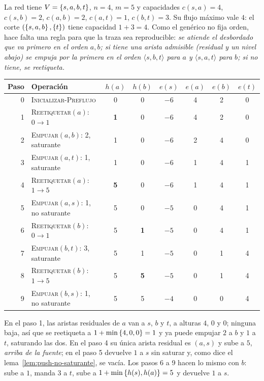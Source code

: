 \documentclass[11pt,letterpaper]{article}
\begin{document}
\begin{ejemplo}
  \label{ej:push-generico}
  La red tiene $V = \left\{ s, a, b, t \right\}$, $n = 4$, $m = 5$ y capacidades
  $c(s, a) = 4$, $c(s, b) = 2$, $c(a, b) = 2$, $c(a, t) = 1$,
  $c(b, t) = 3$. Su flujo máximo vale $4$: el corte
  $(\left\{ s, a, b \right\}, \left\{ t \right\})$ tiene capacidad $1 + 3 = 4$. Como el
  genérico no fija orden, hace falta una regla para que la traza sea
  reproducible: \emph{se atiende el desbordado que va primero en el
  orden $a, b$; si tiene una arista admisible (residual y un nivel
  abajo) se empuja por la primera en el orden
  $\langle s, b, t\rangle$ para $a$ y $\langle s, a, t\rangle$ para
  $b$; si no tiene, se reetiqueta.}
  \begin{center}
  \small
  \begin{tabular}{rlcccccc}
    \toprule
    \textbf{Paso} & \textbf{Operación} & $h(a)$ & $h(b)$
      & $e(s)$ & $e(a)$ & $e(b)$ & $e(t)$ \\
    \midrule
    0 & \textsc{Inicializar-Preflujo} & 0 & 0 & $-6$ & 4 & 2 & 0 \\
    1 & \textsc{Reetiquetar}$(a)$: $0 \to 1$ & \textbf{1} & 0
      & $-6$ & 4 & 2 & 0 \\
    2 & \textsc{Empujar}$(a, b)$: 2, saturante & 1 & 0
      & $-6$ & 2 & 4 & 0 \\
    3 & \textsc{Empujar}$(a, t)$: 1, saturante & 1 & 0
      & $-6$ & 1 & 4 & 1 \\
    4 & \textsc{Reetiquetar}$(a)$: $1 \to 5$ & \textbf{5} & 0
      & $-6$ & 1 & 4 & 1 \\
    5 & \textsc{Empujar}$(a, s)$: 1, no saturante & 5 & 0
      & $-5$ & 0 & 4 & 1 \\
    6 & \textsc{Reetiquetar}$(b)$: $0 \to 1$ & 5 & \textbf{1}
      & $-5$ & 0 & 4 & 1 \\
    7 & \textsc{Empujar}$(b, t)$: 3, saturante & 5 & 1
      & $-5$ & 0 & 1 & 4 \\
    8 & \textsc{Reetiquetar}$(b)$: $1 \to 5$ & 5 & \textbf{5}
      & $-5$ & 0 & 1 & 4 \\
    9 & \textsc{Empujar}$(b, s)$: 1, no saturante & 5 & 5
      & $-4$ & 0 & 0 & 4 \\
    \bottomrule
  \end{tabular}
  \end{center}
  En el paso 1, las aristas residuales de $a$ van a $s$, $b$ y $t$, a
  alturas $4$, $0$ y $0$; ninguna baja, así que se reetiqueta a
  $1 + \min\left\{ 4, 0, 0 \right\} = 1$ y ya puede empujar $2$ a $b$ y $1$ a
  $t$, saturando las dos. En el paso 4 su única arista residual es
  $(a, s)$ y sube a $5$, \emph{arriba de la fuente}; en el paso 5
  devuelve $1$ a $s$ sin saturar y, como dice el
  lema~\ref{lem:push-no-saturante}, se vacía. Los pasos 6 a 9 hacen lo
  mismo con $b$: sube a $1$, manda $3$ a $t$, sube a
  $1 + \min\left\{ h(s), h(a) \right\} = 5$ y devuelve $1$ a $s$.


\end{ejemplo}
\end{document}
